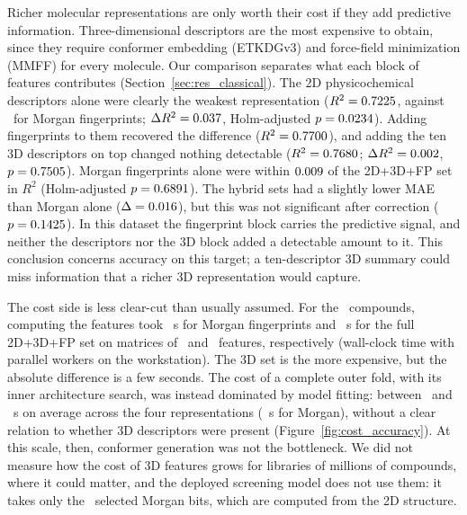 Richer molecular representations are only worth their cost if they add predictive information. Three-dimensional descriptors are the most expensive to obtain, since they require conformer embedding (ETKDGv3) and force-field minimization (MMFF) for every molecule. Our comparison separates what each block of features contributes (Section~\ref{sec:res_classical}). The 2D physicochemical descriptors alone were clearly the weakest representation ($R^2 = 0.7225$, against \MorganRTwoMean\ for Morgan fingerprints; $\Delta R^2 = 0.037$, Holm-adjusted $p = 0.0234$). Adding fingerprints to them recovered the difference ($R^2 = 0.7700$), and adding the ten 3D descriptors on top changed nothing detectable ($R^2 = 0.7680$; $\Delta R^2 = 0.002$, $p = 0.7505$). Morgan fingerprints alone were within $0.009$ of the 2D+3D+FP set in $R^2$ (Holm-adjusted $p = 0.6891$). The hybrid sets had a slightly lower MAE than Morgan alone ($\Delta = 0.016$), but this was not significant after correction ($p = 0.1425$). In this dataset the fingerprint block carries the predictive signal, and neither the descriptors nor the 3D block added a detectable amount to it. This conclusion concerns accuracy on this target; a ten-descriptor 3D summary could miss information that a richer 3D representation would capture.

The cost side is less clear-cut than usually assumed. For the \NCompounds\ compounds, computing the features took \MorganFeaturizationSec\ s for Morgan fingerprints and \RdkitTwoDThreeDFpFeaturizationSec\ s for the full 2D+3D+FP set on matrices of \MorganNFeaturesTotal\ and \RdkitTwoDThreeDFpNFeaturesTotal\ features, respectively (wall-clock time with parallel workers on the workstation). The 3D set is the more expensive, but the absolute difference is a few seconds. The cost of a complete outer fold, with its inner architecture search, was instead dominated by model fitting: between \ClassicalFoldSecMin\ and \ClassicalFoldSecMax\ s on average across the four representations (\ClassicalMorganFoldSec\ s for Morgan), without a clear relation to whether 3D descriptors were present (Figure~\ref{fig:cost_accuracy}). At this scale, then, conformer generation was not the bottleneck. We did not measure how the cost of 3D features grows for libraries of millions of compounds, where it could matter, and the deployed screening model does not use them: it takes only the \ScreenMaskBits\ selected Morgan bits, which are computed from the 2D structure.

